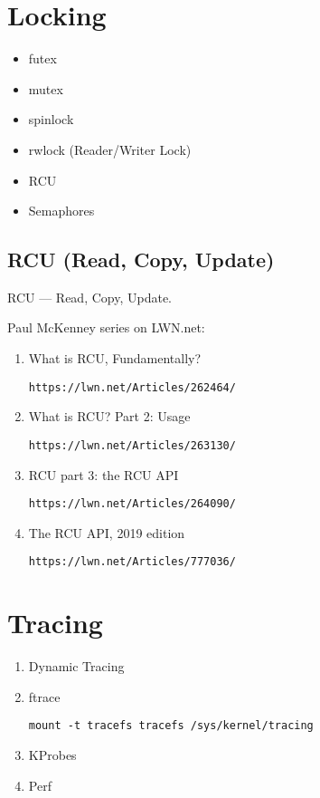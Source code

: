 \documentclass[12pt,a4paper]{article}
\begin{document}
\section{Locking}

\begin{itemize}
\item futex
\item mutex
\item spinlock
\item rwlock (Reader/Writer Lock)
\item RCU
\item Semaphores
\end{itemize}

\subsection{RCU (Read, Copy, Update)}

RCU --- Read, Copy, Update.

Paul McKenney series on LWN.net:

\begin{enumerate}

\item What is RCU, Fundamentally?

	\texttt{https://lwn.net/Articles/262464/}

\item What is RCU? Part 2: Usage

	\texttt{https://lwn.net/Articles/263130/}

\item RCU part 3: the RCU API

	\texttt{https://lwn.net/Articles/264090/}

\item The RCU API, 2019 edition

	\texttt{https://lwn.net/Articles/777036/}

\end{enumerate}

\section{Tracing}

\begin{enumerate}
\item Dynamic Tracing
\item ftrace
\begin{verbatim}
mount -t tracefs tracefs /sys/kernel/tracing
\end{verbatim}
\item KProbes
\item Perf
\end{enumerate}
\end{document}
